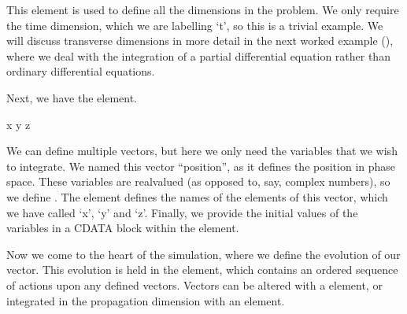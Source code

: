 \documentclass[letterpaper,10pt,english]{sphinxmanual}
\begin{document}
\sphinxAtStartPar
This element is used to define all the dimensions in the problem.  We only require the time dimension, which we are labelling ‘t’, so this is a trivial example.  We will discuss transverse dimensions in more detail in the next worked example ({\hyperref[\detokenize{worked_examples:nonlinearschrodingerequation}]{}}), where we deal with the integration of a partial differential equation rather than ordinary differential equations.

\sphinxAtStartPar
Next, we have the  element.

\begin{sphinxVerbatim}[commandchars=\\\{\}]
  
    x y z
    \PYG{c+cp}{\PYGZlt{}![CDATA[}
          
    \PYG{c+cp}{]]\PYGZgt{}}
\end{sphinxVerbatim}

\sphinxAtStartPar
We can define multiple vectors, but here we only need the variables that we wish to integrate.  We named this vector “position”, as it defines the position in phase space.  These variables are real\sphinxhyphen{}valued (as opposed to, say, complex numbers), so we define .  The  element defines the names of the elements of this vector, which we have called ‘x’, ‘y’ and ‘z’.  Finally, we provide the initial values of the variables in a CDATA block within the  element.

\sphinxAtStartPar
Now we come to the heart of the simulation, where we define the evolution of our vector.  This evolution is held in the  element, which contains an ordered sequence of actions upon any defined vectors.  Vectors can be altered with a  element, or integrated in the propagation dimension with an  element.
\end{document}
